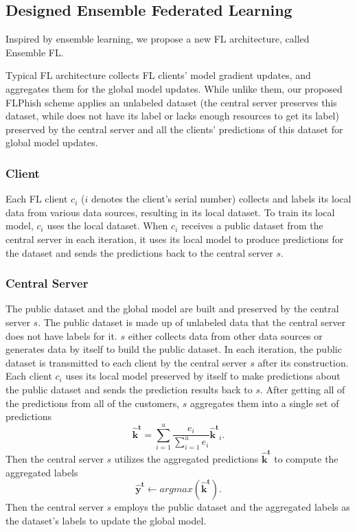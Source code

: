 \documentclass[journal]{IEEEtran}
\begin{document}
\subsection{Designed Ensemble Federated Learning}
Inspired by ensemble learning, we propose a new FL architecture, called Ensemble FL.
\par Typical FL architecture collects FL clients' model gradient updates, and aggregates them for the global model updates. While unlike them, our proposed FLPhish scheme applies an unlabeled dataset (the central server preserves this dataset, while does not have its label or lacks enough resources to get its label) preserved by the central server and all the clients' predictions of this dataset for global model updates.
\subsubsection{{Client}} Each FL client {$c_{i}$} ($i$ denotes the client's serial number) collects and labels its local data from various data sources, resulting in its local dataset. To train its local model, {$c_{i}$} uses the local dataset. When {$c_{i}$} receives a public dataset from the central server in each iteration, it uses its local model to produce predictions for the dataset and sends the predictions back to the central server $s$.
\subsubsection{{Central Server}} The public dataset and the global model are built and preserved by the central server $s$. The public dataset is made up of unlabeled data that the central server does not have labels for it. $s$ either collects data from other data sources or generates data by itself to build the public dataset. In each iteration, the public dataset is transmitted to each client by the central server $s$ after its construction. Each client $c_i$ uses its local model preserved by itself to make predictions about the public dataset and sends the prediction results back to $s$. After getting all of the predictions from all of the customers, $s$ aggregates them into a single set of predictions
\begin{equation}
  \mathbf{\hat{k}^t}=\sum_{i=1}^{u}\frac{e_i}{\sum_{i=1}^{u}e_i}\mathbf{\hat{k}^t}_i.
\end{equation}
Then the central server $s$ utilizes the aggregated predictions $\mathbf{\hat{k}^t}$ to compute the aggregated labels
\begin{equation}
  \mathbf{\hat{y}^t}\gets argmax(\mathbf{\hat{k}^t}).
\end{equation} 
Then the central server {$s$} employs the public dataset and the aggregated labels as the dataset's labels to update the global model.
\end{document}
